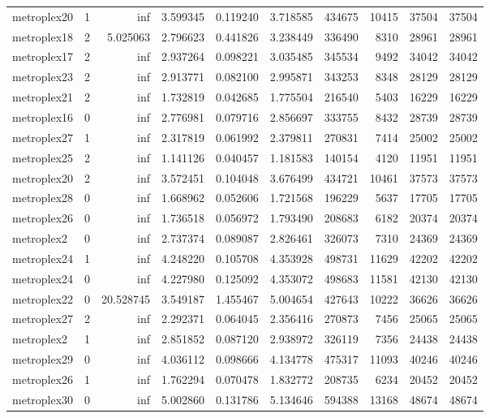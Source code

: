 \begin{longtable}{|l|r|r|r|r|r|r|r|r|r|}
metroplex20 & 1 & inf & 3.599345 & 0.119240 & 3.718585 & 434675 & 10415 & 37504 & 37504 \\
metroplex18 & 2 & 5.025063 & 2.796623 & 0.441826 & 3.238449 & 336490 & 8310 & 28961 & 28961 \\
metroplex17 & 2 & inf & 2.937264 & 0.098221 & 3.035485 & 345534 & 9492 & 34042 & 34042 \\
metroplex23 & 2 & inf & 2.913771 & 0.082100 & 2.995871 & 343253 & 8348 & 28129 & 28129 \\
metroplex21 & 2 & inf & 1.732819 & 0.042685 & 1.775504 & 216540 & 5403 & 16229 & 16229 \\
metroplex16 & 0 & inf & 2.776981 & 0.079716 & 2.856697 & 333755 & 8432 & 28739 & 28739 \\
metroplex27 & 1 & inf & 2.317819 & 0.061992 & 2.379811 & 270831 & 7414 & 25002 & 25002 \\
metroplex25 & 2 & inf & 1.141126 & 0.040457 & 1.181583 & 140154 & 4120 & 11951 & 11951 \\
metroplex20 & 2 & inf & 3.572451 & 0.104048 & 3.676499 & 434721 & 10461 & 37573 & 37573 \\
metroplex28 & 0 & inf & 1.668962 & 0.052606 & 1.721568 & 196229 & 5637 & 17705 & 17705 \\
metroplex26 & 0 & inf & 1.736518 & 0.056972 & 1.793490 & 208683 & 6182 & 20374 & 20374 \\
metroplex2 & 0 & inf & 2.737374 & 0.089087 & 2.826461 & 326073 & 7310 & 24369 & 24369 \\
metroplex24 & 1 & inf & 4.248220 & 0.105708 & 4.353928 & 498731 & 11629 & 42202 & 42202 \\
metroplex24 & 0 & inf & 4.227980 & 0.125092 & 4.353072 & 498683 & 11581 & 42130 & 42130 \\
metroplex22 & 0 & 20.528745 & 3.549187 & 1.455467 & 5.004654 & 427643 & 10222 & 36626 & 36626 \\
metroplex27 & 2 & inf & 2.292371 & 0.064045 & 2.356416 & 270873 & 7456 & 25065 & 25065 \\
metroplex2 & 1 & inf & 2.851852 & 0.087120 & 2.938972 & 326119 & 7356 & 24438 & 24438 \\
metroplex29 & 0 & inf & 4.036112 & 0.098666 & 4.134778 & 475317 & 11093 & 40246 & 40246 \\
metroplex26 & 1 & inf & 1.762294 & 0.070478 & 1.832772 & 208735 & 6234 & 20452 & 20452 \\
metroplex30 & 0 & inf & 5.002860 & 0.131786 & 5.134646 & 594388 & 13168 & 48674 & 48674 \\

\end{longtable}
